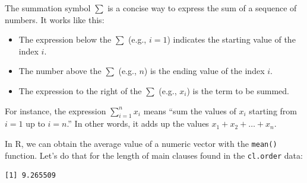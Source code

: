 \documentclass[
  11pt,
  letterpaper,
  DIV=11,
  numbers=noendperiod]{scrreprt}
\newenvironment{Shaded}{\begin{snugshade}}{\end{snugshade}}
\newcommand{\CommentTok}[1]{\textcolor[rgb]{0.37,0.37,0.37}{#1}}
\newcommand{\FunctionTok}[1]{\textcolor[rgb]{0.28,0.35,0.67}{#1}}
\newcommand{\NormalTok}[1]{\textcolor[rgb]{0.00,0.23,0.31}{#1}}
\newcommand{\SpecialCharTok}[1]{\textcolor[rgb]{0.37,0.37,0.37}{#1}}
\begin{document}
\begin{tcolorbox}[enhanced jigsaw, toprule=.15mm, opacitybacktitle=0.6, coltitle=black, arc=.35mm, colback=white, title=\textcolor{quarto-callout-note-color}{\faInfo}\hspace{0.5em}{Hold on, what does this large Σ symbol mean?}, titlerule=0mm, toptitle=1mm, bottomtitle=1mm, breakable, rightrule=.15mm, opacityback=0, bottomrule=.15mm, leftrule=.75mm, colframe=quarto-callout-note-color-frame, left=2mm, colbacktitle=quarto-callout-note-color!10!white]

The summation symbol \(\sum\) is a concise way to express the sum of a
sequence of numbers. It works like this:

\begin{itemize}
\item
  The expression below the \(\sum\) (e.g., \(i = 1\)) indicates the
  starting value of the index \(i\).
\item
  The number above the \(\sum\) (e.g., \(n\)) is the ending value of the
  index \(i\).
\item
  The expression to the right of the \(\sum\) (e.g., \(x_i\)) is the
  term to be summed.
\end{itemize}

For instance, the expression \(\sum_{i=1}^n{x_i}\) means ``sum the
values of \(x_i\) starting from \(i = 1\) up to \(i = n\).'' In other
words, it adds up the values \(x_1 + x_2 + \dots + x_n\).

\end{tcolorbox}

In R, we can obtain the average value of a numeric vector with the
\texttt{mean()} function. Let's do that for the length of main clauses
found in the \texttt{cl.order} data:

\begin{Shaded}
\end{Shaded}

\begin{verbatim}
[1] 9.265509
\end{verbatim}
\end{document}
